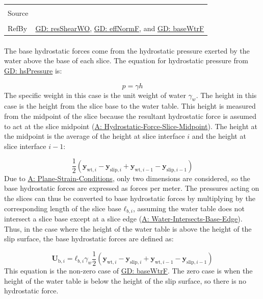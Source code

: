 \documentclass[12pt]{article}
\begin{document}
\begin{minipage}{\textwidth}
\begin{tabular}{>{\raggedright}p{}>{\raggedright\arraybackslash}p{}}
\\ \midrule \\
Source & \cite{fredlund1977}
         
\\ \midrule \\
RefBy & \hyperref[GD:resShearWO]{GD: resShearWO}, \hyperref[GD:effNormF]{GD: effNormF}, and \hyperref[GD:baseWtrF]{GD: baseWtrF}
        
\\ \bottomrule
\end{tabular}
\end{minipage}
\paragraph{}
\label{GD:baseWtrFDeriv}
The base hydrostatic forces come from the hydrostatic pressure exerted by the water above the base of each slice. The equation for hydrostatic pressure from \hyperref[GD:hsPressure]{GD: hsPressure} is:

\begin{displaymath}
p=γ h
\end{displaymath}
The specific weight in this case is the unit weight of water ${γ_{w}}$. The height in this case is the height from the slice base to the water table. This height is measured from the midpoint of the slice because the resultant hydrostatic force is assumed to act at the slice midpoint (\hyperref[assumpHFSM]{A: Hydrostatic-Force-Slice-Midpoint}). The height at the midpoint is the average of the height at slice interface $i$ and the height at slice interface $i-1$:

\begin{displaymath}
\frac{1}{2} \left({\mathbf{y}_{\text{wt},i}}-{\mathbf{y}_{\text{slip},i}}+{\mathbf{y}_{\text{wt},i-1}}-{\mathbf{y}_{\text{slip},i-1}}\right)
\end{displaymath}
Due to \hyperref[assumpPSC]{A: Plane-Strain-Conditions}, only two dimensions are considered, so the base hydrostatic forces are expressed as forces per meter. The pressures acting on the slices can thus be converted to base hydrostatic forces by multiplying by the corresponding length of the slice base ${\mathbf{ℓ}_{b,i}}$, assuming the water table does not intersect a slice base except at a slice edge (\hyperref[assumpWIBE]{A: Water-Intersects-Base-Edge}). Thus, in the case where the height of the water table is above the height of the slip surface, the base hydrostatic forces are defined as:

\begin{displaymath}
{\mathbf{U}_{\text{b},i}}={\mathbf{ℓ}_{b,i}} {γ_{w}} \frac{1}{2} \left({\mathbf{y}_{\text{wt},i}}-{\mathbf{y}_{\text{slip},i}}+{\mathbf{y}_{\text{wt},i-1}}-{\mathbf{y}_{\text{slip},i-1}}\right)
\end{displaymath}
This equation is the non-zero case of \hyperref[GD:baseWtrF]{GD: baseWtrF}. The zero case is when the height of the water table is below the height of the slip surface, so there is no hydrostatic force.
\end{document}
